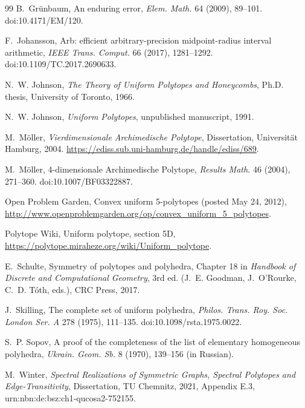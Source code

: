 \documentclass[11pt]{article}
\theoremstyle{definition}
\theoremstyle{remark}
\begin{document}
\begin{thebibliography}{99}
B.~Grünbaum, An enduring error, \emph{Elem. Math.} 64 (2009), 89--101.
doi:10.4171/EM/120.

F.~Johansson, Arb: efficient arbitrary-precision midpoint-radius interval
arithmetic, \emph{IEEE Trans. Comput.} 66 (2017), 1281--1292.
doi:10.1109/TC.2017.2690633.

N.~W. Johnson, \emph{The Theory of Uniform Polytopes and Honeycombs}, Ph.D.
thesis, University of Toronto, 1966.

N.~W. Johnson, \emph{Uniform Polytopes}, unpublished manuscript, 1991.

M.~Möller, \emph{Vierdimensionale Archimedische Polytope}, Dissertation,
Universität Hamburg, 2004. \url{https://ediss.sub.uni-hamburg.de/handle/ediss/689}.

M.~Möller, 4-dimensionale Archimedische Polytope, \emph{Results Math.} 46
(2004), 271--360. doi:10.1007/BF03322887.

Open Problem Garden, Convex uniform 5-polytopes (posted May 24, 2012),
\url{http://www.openproblemgarden.org/op/convex_uniform_5_polytopes}.

Polytope Wiki, Uniform polytope, section 5D,
\url{https://polytope.miraheze.org/wiki/Uniform_polytope}.

E.~Schulte, Symmetry of polytopes and polyhedra, Chapter 18 in
\emph{Handbook of Discrete and Computational Geometry}, 3rd ed.
(J.~E. Goodman, J.~O'Rourke, C.~D. Tóth, eds.), CRC Press, 2017.

J.~Skilling, The complete set of uniform polyhedra, \emph{Philos. Trans.
Roy. Soc. London Ser. A} 278 (1975), 111--135. doi:10.1098/rsta.1975.0022.

S.~P. Sopov, A proof of the completeness of the list of elementary
homogeneous polyhedra, \emph{Ukrain. Geom. Sb.} 8 (1970), 139--156 (in
Russian).

M.~Winter, \emph{Spectral Realizations of Symmetric Graphs, Spectral
Polytopes and Edge-Transitivity}, Dissertation, TU Chemnitz, 2021,
Appendix E.3, urn:nbn:de:bsz:ch1-qucosa2-752155.

\end{thebibliography}
\end{document}
